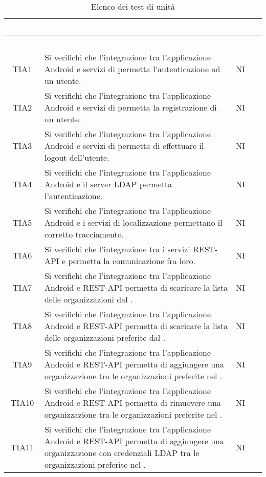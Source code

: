 {
\renewcommand{\arraystretch}{1.5}
\centering
\begin{longtable}{ c C{8.5cm} C{1cm}}
\caption{Elenco dei test di unità}\\
\textcolor{white}{\textbf{Codice}} & \textcolor{white}{\textbf{Descrizione}} & \textcolor{white}{\textbf{Stato}}\\
\endfirsthead
{}
\textcolor{white}{\textbf{Codice}} & \textcolor{white}{\textbf{Descrizione}} & \textcolor{white}{\textbf{Stato}}\\
\endhead

TIA1 & Si verifichi che l’integrazione tra l’applicazione Android e servizi di  permetta l’autenticazione ad un utente. & NI \\
TIA2 & Si verifichi che l’integrazione tra l’applicazione Android e servizi di  permetta la registrazione di un utente. & NI \\
TIA3 & Si verifichi che l’integrazione tra l’applicazione Android e servizi di  permetta di effettuare il logout dell'utente. & NI \\
TIA4 & Si verifichi che l’integrazione tra l’applicazione Android e il server LDAP permetta l’autenticazione. & NI \\
TIA5 & Si verifichi che l’integrazione tra l’applicazione Android e i servizi di localizzazione permettano il corretto tracciamento. & NI \\
TIA6 & Si verifichi che l’integrazione tra i servizi REST-API e  permetta la comunicazione fra loro. & NI \\
TIA7 & Si verifichi che l’integrazione tra l’applicazione Android e REST-API permetta di scaricare la lista delle organizzazioni dal . & NI \\
TIA8 & Si verifichi che l’integrazione tra l’applicazione Android e REST-API permetta di scaricare la lista delle organizzazioni preferite dal . & NI \\
TIA9 & Si verifichi che l’integrazione tra l’applicazione Android e REST-API permetta di aggiungere una organizzazione tra le organizzazioni preferite nel . & NI \\
TIA10 & Si verifichi che l’integrazione tra l’applicazione Android e REST-API permetta di rimuovere una organizzazione tra le organizzazioni preferite nel . & NI \\
TIA11 & Si verifichi che l’integrazione tra l’applicazione Android e REST-API permetta di aggiungere una organizzazione con credenziali LDAP tra le organizzazioni preferite nel . & NI \\

\end{longtable}}
